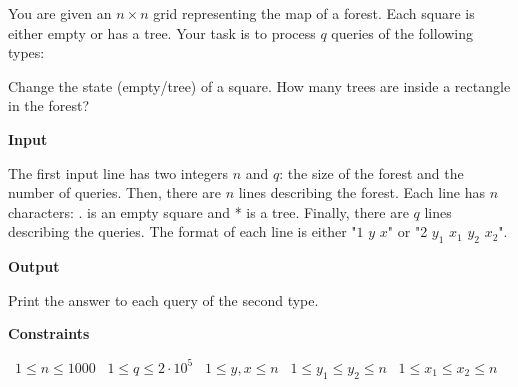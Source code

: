 You are given an $n \times n$ grid representing the map of a forest. Each square is either empty or has a tree. Your task is to process $q$ queries of the following types:

Change the state (empty/tree) of a square.
How many trees are inside a rectangle in the forest?

\vspace{0.3cm}\noindent\textbf{Input}

The first input line has two integers $n$ and $q$: the size of the forest and the number of queries.
Then, there are $n$ lines describing the forest. Each line has $n$ characters: . is an empty square and * is a tree.
Finally, there are $q$ lines describing the queries. The format of each line is either "$1$ $y$ $x$" or "2 $y_1$ $x_1$ $y_2$ $x_2$".

\vspace{0.3cm}\noindent\textbf{Output}

Print the answer to each query of the second type.

\vspace{0.3cm}\noindent\textbf{Constraints}

\textbullet\ $1 \le n \le 1000$
\textbullet\ $1 \le q \le 2 \cdot 10^5$
\textbullet\ $1 \le y,x \le n$
\textbullet\ $1 \le y_1 \le y_2 \le n$
\textbullet\ $1 \le x_1 \le x_2 \le n$